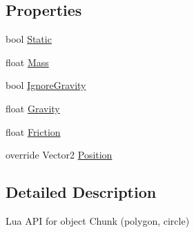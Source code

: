 \subsection*{Properties}
\begin{DoxyCompactItemize}
\item 
bool \hyperlink{classgearit_1_1src_1_1script_1_1api_1_1game_1_1_game_chunk_api_a18d399a262422b2fb35db5e8e926db87}{Static}
\item 
float \hyperlink{classgearit_1_1src_1_1script_1_1api_1_1game_1_1_game_chunk_api_a8837fe24d23c2ac98c5ae2e59ee96577}{Mass}
\item 
bool \hyperlink{classgearit_1_1src_1_1script_1_1api_1_1game_1_1_game_chunk_api_a30e38c6d084b3b9680bee933a7dc2896}{Ignore\+Gravity}
\item 
float \hyperlink{classgearit_1_1src_1_1script_1_1api_1_1game_1_1_game_chunk_api_a93a589a274bd796238a4972f40070a63}{Gravity}
\item 
float \hyperlink{classgearit_1_1src_1_1script_1_1api_1_1game_1_1_game_chunk_api_a5fc87480bcc893d2f712deb82dad3625}{Friction}
\item 
override Vector2 \hyperlink{classgearit_1_1src_1_1script_1_1api_1_1game_1_1_game_chunk_api_a109d237e41af63bf72c66655190135d2}{Position}
\end{DoxyCompactItemize}


\subsection{Detailed Description}
Lua A\+P\+I for object Chunk (polygon, circle) 



